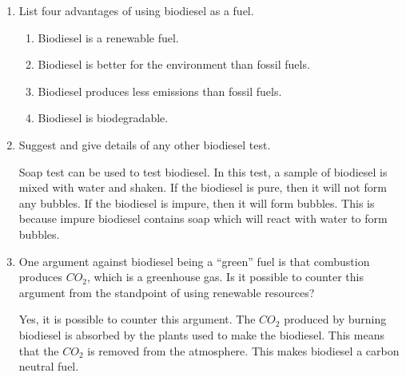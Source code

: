 \documentclass[a4paper, 12pt, english]{article}
\begin{document}
\begin{enumerate}
	\item List four advantages of using biodiesel as a fuel.

	      \begin{enumerate}
		      \item Biodiesel is a renewable fuel.
		      \item Biodiesel is better for the environment than fossil fuels.
		      \item Biodiesel produces less emissions than fossil fuels.
		      \item Biodiesel is biodegradable.
	      \end{enumerate}

	\item Suggest and give details of any other biodiesel test.

	      Soap test can be used to test biodiesel. In this test, a sample of biodiesel is
	      mixed with water and shaken. If the biodiesel is pure, then it will not form
	      any bubbles. If the biodiesel is impure, then it will form bubbles. This is
	      because impure biodiesel contains soap which will react with water to form
	      bubbles.

	\item One argument against biodiesel being a “green” fuel is that combustion produces
	      $CO_2$, which is a greenhouse gas. Is it possible to counter this argument from
	      the standpoint of using renewable resources?

	      Yes, it is possible to counter this argument. The $CO_2$ produced by burning
	      biodiesel is absorbed by the plants used to make the biodiesel. This means that
	      the $CO_2$ is removed from the atmosphere. This makes biodiesel a carbon
	      neutral fuel.

\end{enumerate}
\end{document}
